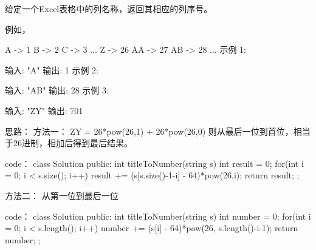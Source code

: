 给定一个Excel表格中的列名称，返回其相应的列序号。

例如，

    A -> 1
    B -> 2
    C -> 3
    ...
    Z -> 26
    AA -> 27
    AB -> 28 
    ...
示例 1:

输入: "A"
输出: 1
示例 2:

输入: "AB"
输出: 28
示例 3:

输入: "ZY"
输出: 701














思路：
方法一：
ZY = 26*pow(26,1) + 26*pow(26,0)
则从最后一位到首位，相当于26进制，相加后得到最后结果。
















code：
class Solution {
public:
    int titleToNumber(string s) {
        int result = 0;
        for(int i = 0; i < s.size(); i++)
        {
            result += (s[s.size()-1-i] - 64)*pow(26,i);
        }
        return result;
    }
};














方法二：
从第一位到最后一位










code：
class Solution {
public:
    int titleToNumber(string s) {
        int number = 0;
        for(int i = 0; i < s.length(); i++)
        {
            number += (s[i] - 64)*pow(26, s.length()-i-1);
        }
        return number;
    }
};
